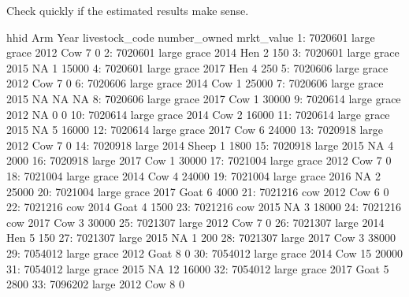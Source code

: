 Check quickly if the estimated results make sense.
\begin{Schunk}
\begin{Soutput}
           hhid         Arm Year livestock_code number_owned mrkt_value
 1:     7020601 large grace 2012            Cow            7          0
 2:     7020601 large grace 2014            Hen            2        150
 3:     7020601 large grace 2015             NA            1      15000
 4:     7020601 large grace 2017            Hen            4        250
 5:     7020606 large grace 2012            Cow            7          0
 6:     7020606 large grace 2014            Cow            1      25000
 7:     7020606 large grace 2015             NA           NA         NA
 8:     7020606 large grace 2017            Cow            1      30000
 9:     7020614 large grace 2012             NA            0          0
10:     7020614 large grace 2014            Cow            2      16000
11:     7020614 large grace 2015             NA            5      16000
12:     7020614 large grace 2017            Cow            6      24000
13:     7020918       large 2012            Cow            7          0
14:     7020918       large 2014          Sheep            1       1800
15:     7020918       large 2015             NA            4       2000
16:     7020918       large 2017            Cow            1      30000
17:     7021004 large grace 2012            Cow            7          0
18:     7021004 large grace 2014            Cow            4      24000
19:     7021004 large grace 2016             NA            2      25000
20:     7021004 large grace 2017           Goat            6       4000
21:     7021216         cow 2012            Cow            6          0
22:     7021216         cow 2014           Goat            4       1500
23:     7021216         cow 2015             NA            3      18000
24:     7021216         cow 2017            Cow            3      30000
25:     7021307       large 2012            Cow            7          0
26:     7021307       large 2014            Hen            5        150
27:     7021307       large 2015             NA            1        200
28:     7021307       large 2017            Cow            3      38000
29:     7054012 large grace 2012           Goat            8          0
30:     7054012 large grace 2014            Cow           15      20000
31:     7054012 large grace 2015             NA           12      16000
32:     7054012 large grace 2017           Goat            5       2800
33:     7096202       large 2012            Cow            8          0

\end{Soutput}
\end{Schunk}
